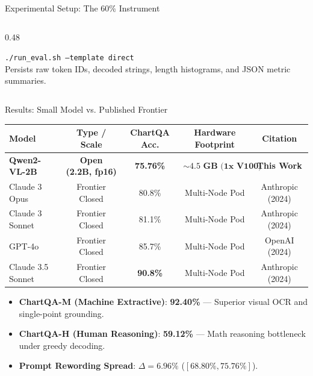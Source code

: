 \documentclass[aspectratio=169, 10pt]{beamer}
\begin{document}
\begin{frame}{Experimental Setup: The 60\% Instrument}
\begin{columns}[T]
\begin{column}{0.48\textwidth}
            \vspace{0.2cm}
            \begin{tcolorbox}[colframe=secondary, title=\textbf{One-Command Re-run}]
                \small
                \texttt{./run\_eval.sh --template direct}\\
                \footnotesize
                Persists raw token IDs, decoded strings, length histograms, and JSON metric summaries.
            \end{tcolorbox}
        \end{column}
    \end{columns}
\end{frame}

\begin{frame}{Results: Small Model vs. Published Frontier}
    \begin{table}
        \centering
        \small
        \begin{tabular}{@{}lcccc@{}}
            \toprule
            \textbf{Model} & \textbf{Type / Scale} & \textbf{ChartQA Acc.} & \textbf{Hardware Footprint} & \textbf{Citation} \\
            \midrule
            \textbf{Qwen2-VL-2B} & \textbf{Open (2.2B, fp16)} & \textbf{75.76\%} & $\mathbf{\sim 4.5\text{ GB (1x V100)}}$ & \textbf{This Work} \\
            Claude 3 Opus & Frontier Closed & 80.8\% & Multi-Node Pod & Anthropic (2024) \\
            Claude 3 Sonnet & Frontier Closed & 81.1\% & Multi-Node Pod & Anthropic (2024) \\
            GPT-4o & Frontier Closed & 85.7\% & Multi-Node Pod & OpenAI (2024) \\
            Claude 3.5 Sonnet & Frontier Closed & \textbf{90.8\%} & Multi-Node Pod & Anthropic (2024) \\
            \bottomrule
        \end{tabular}
    \end{table}

    \vspace{0.1cm}
    \begin{tcolorbox}[colframe=secondary, title=\textbf{Qwen2-VL-2B Performance Breakdown by Sub-Split}]
        \small
        \begin{itemize}
            \item \textbf{ChartQA-M (Machine Extractive)}: \textbf{92.40\%} --- Superior visual OCR and single-point grounding.
            \item \textbf{ChartQA-H (Human Reasoning)}: \textbf{59.12\%} --- Math reasoning bottleneck under greedy decoding.
            \item \textbf{Prompt Rewording Spread}: \textbf{$\Delta = 6.96\%$} ($[68.80\%, 75.76\%]$).
        \end{itemize}
    \end{tcolorbox}


\end{frame}
\end{document}
